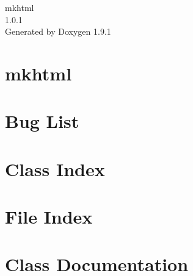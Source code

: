 \let\mypdfximage\pdfximage\def\pdfximage{\immediate\mypdfximage}\documentclass[twoside]{book}
\newcommand{\+}{\discretionary{\mbox{\scriptsize$\hookleftarrow$}}{}{}}
\newcommand{\clearemptydoublepage}{%
  \newpage{\pagestyle{empty}\cleardoublepage}%
}
\begin{document}
\raggedbottom

\hypersetup{pageanchor=false,
             bookmarksnumbered=true,
             pdfencoding=unicode
            }
\begin{titlepage}
\vspace*{7cm}
\begin{center}%
{\Large mkhtml \\[1ex]\large 1.\+0.\+1 }\\
\vspace*{1cm}
{\large Generated by Doxygen 1.9.1}\\
\end{center}
\end{titlepage}
\clearemptydoublepage
{}
\tableofcontents
\clearemptydoublepage
{}
\hypersetup{pageanchor=true}

\chapter{mkhtml}
\label{index}\hypertarget{index}{}
\chapter{Bug List}
\label{bug}

\chapter{Class Index}

\chapter{File Index}

\chapter{Class Documentation}







\end{document}
